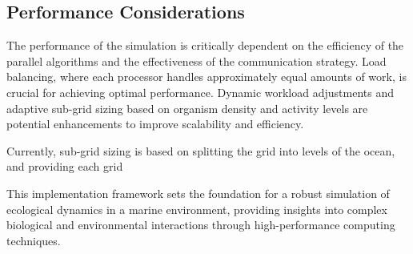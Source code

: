 \documentclass[conference,compsoc]{IEEEtran}
\begin{document}
\subsection{Performance Considerations}

The performance of the simulation is critically dependent on the efficiency of the parallel algorithms and the effectiveness of the communication strategy. Load balancing, where each processor handles approximately equal amounts of work, is crucial for achieving optimal performance. Dynamic workload adjustments and adaptive sub-grid sizing based on organism density and activity levels are potential enhancements to improve scalability and efficiency.

Currently, sub-grid sizing is based on splitting the grid into levels of the ocean, and providing each grid

This implementation framework sets the foundation for a robust simulation of ecological dynamics in a marine environment, providing insights into complex biological and environmental interactions through high-performance computing techniques.

%
%

\end{document}
